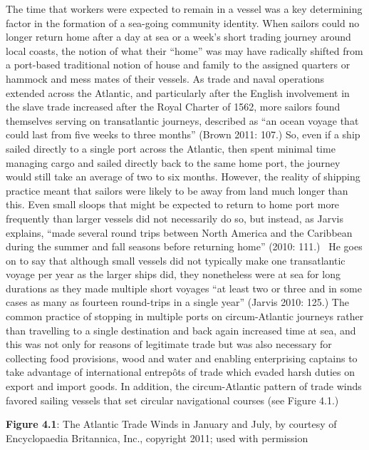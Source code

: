 \begin{styleStandard}
The time that workers were expected to remain in a vessel was a key determining factor in the formation of a sea-going community identity. When sailors could no longer return home after a day at sea or a week’s short trading journey around local coasts, the notion of what their “home” was may have radically shifted from a port-based traditional notion of house and family to the assigned quarters or hammock and mess mates of their vessels. As trade and naval operations extended across the Atlantic, and particularly after the English involvement in the slave trade increased after the Royal Charter of 1562, more sailors found themselves serving on transatlantic journeys, described as “an ocean voyage that could last from five weeks to three months” (Brown 2011: 107.) So, even if a ship sailed directly to a single port across the Atlantic, then spent minimal time managing cargo and sailed directly back to the same home port, the journey would still take an average of two to six months. However, the reality of shipping practice meant that sailors were likely to be away from land much longer than this. Even small sloops that might be expected to return to home port more frequently than larger vessels did not necessarily do so, but instead, as Jarvis explains, “made several round trips between North America and the Caribbean during the summer and fall seasons before returning home” (2010: 111.) \ He goes on to say that although small vessels did not typically make one transatlantic voyage per year as the larger ships did, they nonetheless were at sea for long durations as they made multiple short voyages “at least two or three and in some cases as many as fourteen round-trips in a single year” (Jarvis 2010: 125.) The common practice of stopping in multiple ports on circum-Atlantic journeys rather than travelling to a single destination and back again increased time at sea, and this was not only for reasons of legitimate trade but was also necessary for collecting food provisions, wood and water and enabling enterprising captains to take advantage of international entrepôts of trade which evaded harsh duties on export and import goods. In addition, the circum-Atlantic pattern of trade winds favored sailing vessels that set circular navigational courses (see Figure 4.1.) 
\end{styleStandard}


\begin{styleStandard}
\textbf{Figure 4.1}: The Atlantic Trade Winds in January and July, by courtesy of Encyclopaedia Britannica, Inc., copyright 2011; used with permission
\end{styleStandard}

